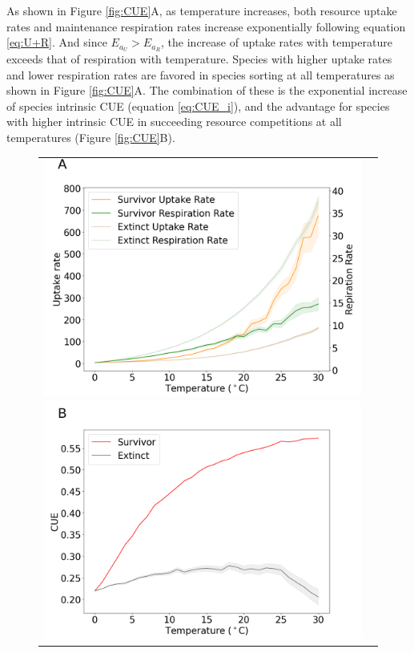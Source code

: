\documentclass[11pt, a4paper]{article}
\begin{document}
\begin{spacing}{1.5}
As shown in Figure \ref{fig:CUE}A, as temperature increases, both resource uptake rates and maintenance respiration rates increase exponentially following equation \ref{eq:U+R}. And since $E_{a_U} > E_{a_R}$, the increase of uptake rates with temperature exceeds that of respiration with temperature. Species with higher uptake rates and lower respiration rates are favored in species sorting at all temperatures as shown in Figure \ref{fig:CUE}A. The combination of these is the exponential increase of species intrinsic CUE (equation \ref{eq:CUE_i}), and the advantage for species with higher intrinsic CUE in succeeding resource competitions at all temperatures (Figure \ref{fig:CUE}B). 

\begin{figure}
    \centering
    \begin{tabular}{c@{}c@{}}
    \includegraphics[scale=0.27]{./Figures/selectingEaCUE_1.png}
    \includegraphics[scale=0.27]{./Figures/selectingEaCUE_2.png}

\end{tabular}
\end{figure}
\end{spacing}
\end{document}
